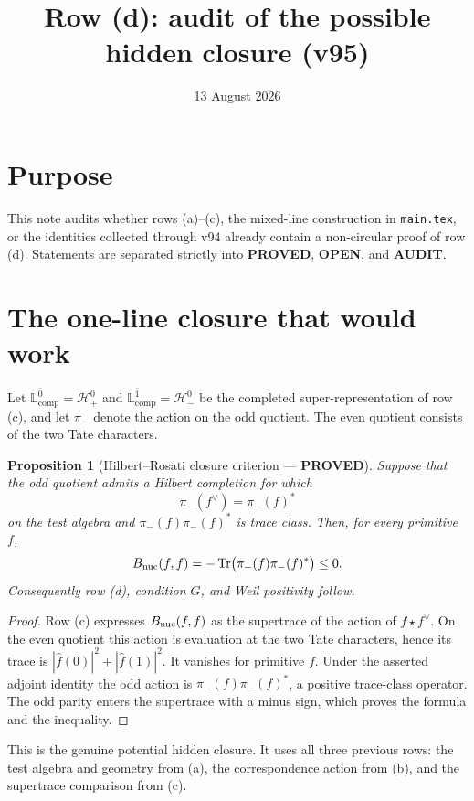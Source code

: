 \documentclass[11pt]{article}
\title{Row (d): audit of the possible hidden closure (v95)}
\date{13 August 2026}
\newcommand{\PROVED}{\textcolor{green!40!black}{\textbf{PROVED}}}
\newcommand{\OPEN}{\textcolor{red!70!black}{\textbf{OPEN}}}
\newcommand{\AUDIT}{\textcolor{orange!70!black}{\textbf{AUDIT}}}
\newtheorem{proposition}{Proposition}
\begin{document}
\maketitle

\section*{Purpose}
This note audits whether rows (a)--(c), the mixed-line construction in
\texttt{main.tex}, or the identities collected through v94 already contain a
non-circular proof of row (d).  Statements are separated strictly into
\PROVED, \OPEN, and \AUDIT.

\section{The one-line closure that would work}

Let $\mathbb L_{\mathrm{comp}}^{\bar0}=\mathcal H_+^0$ and
$\mathbb L_{\mathrm{comp}}^{\bar1}=\mathcal H_-^0$ be the completed
super-representation of row (c), and let $\pi_-$ denote the action on the odd
quotient.  The even quotient consists of the two Tate characters.

\begin{proposition}[Hilbert--Rosati closure criterion --- \PROVED]
Suppose that the odd quotient admits a Hilbert completion for which
\[
 \pi_-(f^\vee)=\pi_-(f)^*
\]
on the test algebra and $\pi_-(f)\pi_-(f)^*$ is trace class.  Then, for every
primitive $f$,
\[
 B_{\rm nuc}(f,f)=-\operatorname{Tr}
 \bigl(\pi_-(f)\pi_-(f)^*\bigr)\leq0.
\]
Consequently row (d), condition $G$, and Weil positivity follow.
\end{proposition}

\begin{proof}
Row (c) expresses $B_{\rm nuc}(f,f)$ as the supertrace of the action of
$f\star f^\vee$.  On the even quotient this action is evaluation at the two
Tate characters, hence its trace is
$|\widehat f(0)|^2+|\widehat f(1)|^2$.  It vanishes for primitive $f$.
Under the asserted adjoint identity the odd action is
$\pi_-(f)\pi_-(f)^*$, a positive trace-class operator.  The odd parity enters
the supertrace with a minus sign, which proves the formula and the inequality.
\end{proof}

This is the genuine potential hidden closure.  It uses all three previous
rows: the test algebra and geometry from (a), the correspondence action from
(b), and the supertrace comparison from (c).
\end{document}

